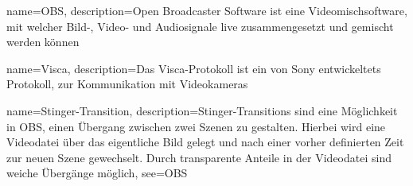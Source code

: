 
 {
	name={OBS},
	description={Open Broadcaster Software ist eine Videomischsoftware, mit welcher Bild-, Video- und Audiosignale live zusammengesetzt und gemischt werden können}
}

 {
	name={Visca},
	description={Das Visca-Protokoll ist ein von Sony entwickeltets Protokoll, zur Kommunikation mit Videokameras}
}

 {
	name={Stinger-Transition},
	description={Stinger-Transitions sind eine Möglichkeit in \Gls{OBS}, einen Übergang zwischen zwei Szenen zu gestalten. Hierbei wird eine Videodatei über das eigentliche Bild gelegt und nach einer vorher definierten Zeit zur neuen Szene gewechselt. Durch transparente Anteile in der Videodatei sind weiche Übergänge möglich},
	see={OBS}
}

\printglossary